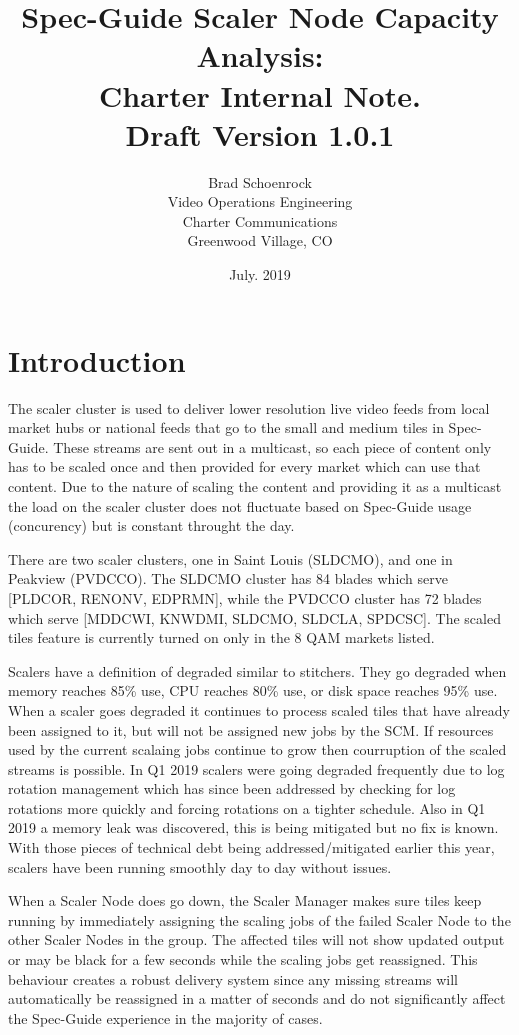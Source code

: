 \documentclass{article}
\author{Brad Schoenrock\\Video Operations Engineering\\Charter Communications\\Greenwood Village, CO}
\title{Spec-Guide Scaler Node Capacity Analysis:\\Charter Internal Note.\\Draft Version 1.0.1}
\date{July. 2019}
\begin{document}
\maketitle
\newpage

\tableofcontents
\newpage

\section{Introduction}
\label{SECTION-Introduction}

The scaler cluster is used to deliver lower resolution live video feeds from local market hubs or national feeds that go to the small and medium tiles in Spec-Guide. These streams are sent out in a multicast, so each piece of content only has to be scaled once and then provided for every market which can use that content. Due to the nature of scaling the content and providing it as a multicast the load on the scaler cluster does not fluctuate based on Spec-Guide usage (concurency) but is constant throught the day. 

There are two scaler clusters, one in Saint Louis (SLDCMO), and one in Peakview (PVDCCO). The SLDCMO cluster has 84 blades which serve [PLDCOR, RENONV, EDPRMN], while the PVDCCO cluster has 72 blades which serve [MDDCWI, KNWDMI, SLDCMO, SLDCLA, SPDCSC]. The scaled tiles feature is currently turned on only in the 8 QAM markets listed. 

Scalers have a definition of degraded similar to stitchers. They go degraded when memory reaches 85\% use, CPU reaches 80\% use, or disk space reaches 95\% use. When a scaler goes degraded it continues to process scaled tiles that have already been assigned to it, but will not be assigned new jobs by the SCM. If resources used by the current scalaing jobs continue to grow then courruption of the scaled streams is possible. In Q1 2019 scalers were going degraded frequently due to log rotation management which has since been addressed by checking for log rotations more quickly and forcing rotations on a tighter schedule. Also in Q1 2019 a memory leak was discovered, this is being mitigated but no fix is known. With those pieces of technical debt being addressed/mitigated earlier this year, scalers have been running smoothly day to day without issues. 

When a Scaler Node does go down, the Scaler Manager makes sure tiles keep running by immediately assigning the scaling jobs of the failed Scaler Node to the other Scaler Nodes in the group. The affected tiles will not show updated output or may be black for a few seconds while the scaling jobs get reassigned. This behaviour creates a robust delivery system since any missing streams will automatically be reassigned in a matter of seconds and do not significantly affect the Spec-Guide experience in the majority of cases. 
\end{document}
